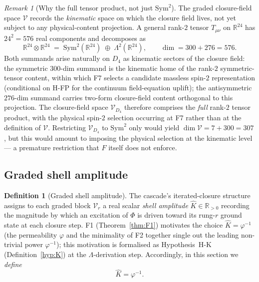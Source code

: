 \documentclass[12pt]{article}
\theoremstyle{definition}
\newtheorem{definition}[theorem]{Definition}
\theoremstyle{remark}
\newtheorem{remark}[theorem]{Remark}
\newcommand{\Vcal}{\mathcal{V}}
\newcommand{\Sym}{\mathrm{Sym}}
\begin{document}
\begin{remark}[Why the full tensor product, not just $\Sym^2$]\label{rem:full-tensor}
The graded closure-field space $\Vcal$ records the \emph{kinematic} space on which the closure field lives, not yet subject to any physical-content projection. A general rank-$2$ tensor $T_{\mu\nu}$ on $\mathbb{R}^{24}$ has $24^2 = 576$ real components and decomposes as
\begin{equation}\label{eq:24x24-decomp}
\mathbb{R}^{24} \otimes \mathbb{R}^{24} \;=\; \Sym^2(\mathbb{R}^{24}) \;\oplus\; \Lambda^2(\mathbb{R}^{24}), \qquad \dim = 300 + 276 = 576.
\end{equation}
Both summands arise naturally on $D_4$ as kinematic sectors of the closure field: the symmetric $300$-dim summand is the kinematic home of the rank-$2$ symmetric-tensor content, within which F7 selects a candidate massless spin-$2$ representation (conditional on H-FP for the continuum field-equation uplift); the antisymmetric $276$-dim summand carries two-form closure-field content orthogonal to this projection. The closure-field space $\Vcal_{D_4}$ therefore comprises the \emph{full} rank-$2$ tensor product, with the physical spin-$2$ selection occurring at F7 rather than at the definition of $\Vcal$. Restricting $\Vcal_{D_4}$ to $\Sym^2$ only would yield $\dim \Vcal = 7 + 300 = 307$, but this would amount to imposing the physical selection at the kinematic level --- a premature restriction that $F$ itself does not enforce.
\end{remark}

\subsection{Graded shell amplitude}

\begin{definition}[Graded shell amplitude]\label{def:K-amplitude}
The cascade's iterated-closure structure assigns to each graded block $\Vcal_r$ a real scalar \emph{shell amplitude} $\widehat{K} \in \mathbb{R}_{>0}$ recording the magnitude by which an excitation of $\Phi$ is driven toward its rung-$r$ ground state at each closure step. F1 (Theorem~\ref{thm:F1}) motivates the choice $\widehat{K} = \varphi^{-1}$ (the permeability $\varphi$ and the minimality of F2 together single out the leading non-trivial power $\varphi^{-1}$); this motivation is formalised as Hypothesis~H-K (Definition~\ref{hyp:K}) at the $\Lambda$-derivation step. Accordingly, in this section we \emph{define}
\begin{equation}
\widehat{K} = \varphi^{-1}.
\end{equation}
\end{definition}
\end{document}
